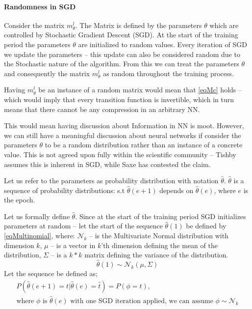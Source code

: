 \documentclass[dissertation.tex]{subfiles}
\begin{document}
\paragraph{Randomness in SGD} 
Consider the matrix $m_\theta^l$. The Matrix is defined by the parameters
$\theta$ which are controlled by Stochastic Gradient Descent (SGD). At the start
of the training period the parameters $\theta$ are initialized to random values.
Every iteration of SGD we update the parameters -- this update can also be
considered random due to the Stochastic nature of the algorithm. From this we
can treat the parameters $\theta$ and consequently the matrix $m_\theta^l$ as
random throughout the training process.

Having $m_\theta^l$ be an instance of a random matrix would mean that
\autoref{eqMc} holds -- which would imply that every transition function is
invertible, which in turn means that there cannot be any compression in an
arbitrary NN.

This would mean having discussion about Information in NN is moot. However, we
can still have a meaningful discussion about neural networks if consider the
parameters $\theta$ to be a random distribution rather than an instance of a
concrete value. This is not agreed upon fully within the scientific community --
Tishby assumes this is inherent in SGD, while Saxe has contested the claim.

Let us refer to the parameters as probability distribution with notation
$\hat\theta$. $\hat\theta$ is a sequence of probability distributions: s.t
$\hat\theta(e+1)$ depends on $\hat\theta(e)$, where $e$ is the epoch.

Let us formally define $\hat\theta$. Since at the start of the training period
SGD initializes parameters at random -- let the start of the sequence
$\hat\theta(1)$ be defined by \autoref{eqMultinomial}, where: $\mathcal{N}_k$ --
is the Multivariate Normal distribution with dimension $k$, $\mu$ -- is a vector
in $k$'th dimension defining the mean of the distribution, $\Sigma$ -- is a
$k*k$ matrix defining the variance of the distribution.
\begin{equation}
  \hat\theta(1)\sim\mathcal{N}_k(\mu,\Sigma)
  \label{eqMultinomial}
\end{equation}
Let the sequence be defined as;
\begin{gather}
  P(\hat\theta(e+1) = t | \hat\theta(e) = \hat{t}) = P(\phi = t), \\
  \text{where }\phi
  \text{ is }\hat\theta(e)
  \text{ with one SGD iteration applied, we can assume }
  \phi\sim\mathcal{N}_k
  \label{eqSequence}
\end{gather}
\end{document}
